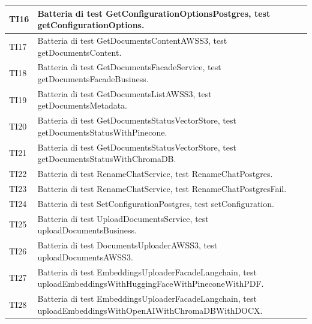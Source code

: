 \documentclass[10pt, a4paper]{article}
\begin{document}
\begin{xltabular}{\textwidth}{p{0.12\textwidth}|X}
    \hline
    TI16 & Batteria di test GetConfigurationOptionsPostgres, test getConfigurationOptions. \\
    \hline
    TI17 & Batteria di test GetDocumentsContentAWSS3, test getDocumentsContent. \\
    \hline
    TI18 & Batteria di test GetDocumentsFacadeService, test getDocumentsFacadeBusiness. \\
    \hline
    TI19 & Batteria di test GetDocumentsListAWSS3, test getDocumentsMetadata. \\
    \hline
    TI20 & Batteria di test GetDocumentsStatusVectorStore, test getDocumentsStatusWithPinecone. \\
    \hline
    TI21 & Batteria di test GetDocumentsStatusVectorStore, test getDocumentsStatusWithChromaDB. \\
    \hline
    TI22 & Batteria di test RenameChatService, test RenameChatPostgres. \\
    \hline
    TI23 & Batteria di test RenameChatService, test RenameChatPostgresFail. \\
    \hline
    TI24 & Batteria di test SetConfigurationPostgres, test setConfiguration. \\
    \hline
    TI25 & Batteria di test UploadDocumentsService, test uploadDocumentsBusiness. \\
    \hline
    TI26 & Batteria di test DocumentsUploaderAWSS3, test uploadDocumentsAWSS3. \\
    \hline
    TI27 & Batteria di test EmbeddingsUploaderFacadeLangchain, test uploadEmbeddingsWithHuggingFaceWithPineconeWithPDF. \\
    \hline
    TI28 & Batteria di test EmbeddingsUploaderFacadeLangchain, test uploadEmbeddingsWithOpenAIWithChromaDBWithDOCX. \\
    \hline
\end{xltabular}
\end{document}
